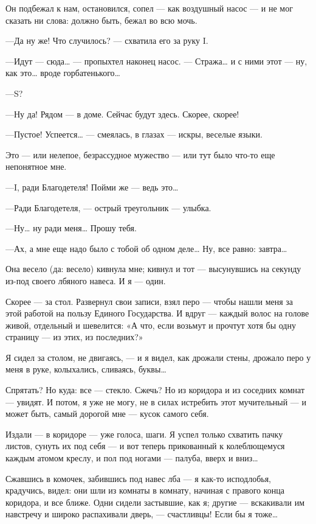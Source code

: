 \documentclass[11pt,openany]{book}
\begin{document}
Он подбежал к нам, остановился, сопел --- как воздушный насос --- и не мог сказать ни слова: должно быть, бежал во всю мочь.

---Да ну же! Что случилось? --- схватила его за руку I.

---Идут --- сюда\ldots{} --- пропыхтел наконец насос. --- Стража\ldots{} и с ними этот --- ну, как это\ldots{} вроде горбатенького\ldots{}

\begin{center}\textsc{---S?}\end{center}

---Ну да! Рядом --- в доме. Сейчас будут здесь. Скорее, скорее!

---Пустое! Успеется\ldots{} --- смеялась, в глазах --- искры, веселые языки.

Это --- или нелепое, безрассудное мужество --- или тут было что-то еще непонятное мне.

---I, ради Благодетеля! Пойми же --- ведь это\ldots{}

---Ради Благодетеля, --- острый треугольник --- улыбка.

---Ну\ldots{} ну ради меня\ldots{} Прошу тебя.

---Ах, а мне еще надо было с тобой об одном деле\ldots{} Ну, все равно: завтра\ldots{}

Она весело (да: весело) кивнула мне; кивнул и тот --- высунувшись на секунду из-под своего лбяного навеса. И я --- один.

Скорее --- за стол. Развернул свои записи, взял перо --- чтобы  нашли меня за этой работой на пользу Единого Государства. И вдруг --- каждый волос на голове живой, отдельный и шевелится: «А что, если возьмут и прочтут хотя бы одну страницу --- из этих, из последних?»

Я сидел за столом, не двигаясь, --- и я видел, как дрожали стены, дрожало перо у меня в руке, колыхались, сливаясь, буквы\ldots{}

Спрятать? Но куда: все --- стекло. Сжечь? Но из коридора и из соседних комнат --- увидят. И потом, я уже не могу, не в силах истребить этот мучительный --- и может быть, самый дорогой мне --- кусок самого себя.

Издали --- в коридоре --- уже голоса, шаги. Я успел только схватить пачку листов, сунуть их под себя --- и вот теперь прикованный к колеблющемуся каждым атомом креслу, и пол под ногами --- палуба, вверх и вниз\ldots{}

Сжавшись в комочек, забившись под навес лба --- я как-то исподлобья, крадучись, видел: они шли из комнаты в комнату, начиная с правого конца коридора, и все ближе. Одни сидели застывшие, как я; другие --- вскакивали им навстречу и широко распахивали дверь, --- счастливцы! Если бы я тоже\ldots{}
\end{document}

